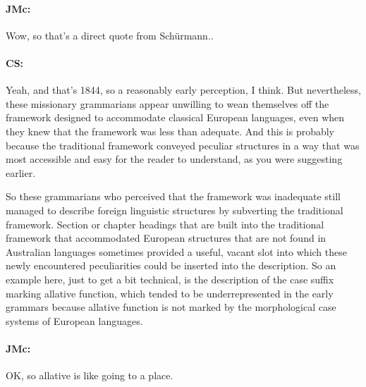\documentclass[output=paper]{langscibook}
\begin{document}
\paragraph*{JMc:}  Wow, so that’s a direct quote from Schürmann..


\paragraph*{CS:}  Yeah, and that’s 1844, so a reasonably early perception, I think. But nevertheless, these missionary grammarians appear unwilling to wean themselves off the framework designed to accommodate classical European languages, even when they knew that the framework was less than adequate. And this is probably because the traditional framework conveyed peculiar structures in a way that was most accessible and easy for the reader to understand, as you were suggesting earlier.

So these grammarians who perceived that the framework was inadequate still managed to describe foreign linguistic structures by subverting the traditional framework. Section or chapter headings that are built into the traditional framework that accommodated European structures that are not found in Australian languages sometimes provided a useful, vacant slot into which these newly encountered peculiarities could be inserted into the description. So an example here, just to get a bit technical, is the description of the case suffix marking allative function, which tended to be underrepresented in the early grammars because allative function is not marked by the morphological case systems of European languages.


\paragraph*{JMc:}  OK, so allative is like going to a place.
\end{document}
